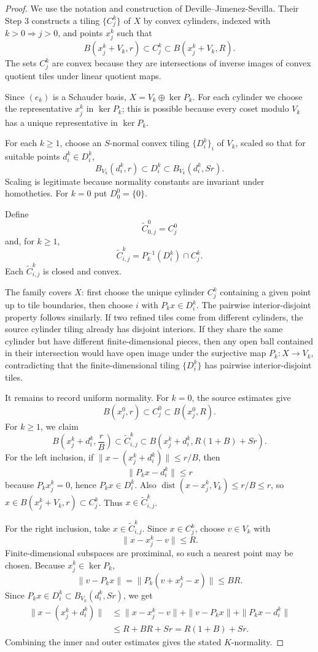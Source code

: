 \documentclass[11pt]{article}
\newcommand{\dist}{\operatorname{dist}}
\begin{document}
\begin{proof}
We use the notation and construction of Deville--Jimenez-Sevilla. Their Step
3 constructs a tiling $\{C^k_j\}$ of $X$ by convex cylinders, indexed with
$k>0\Rightarrow j>0$, and points $x^k_j$ such that
\[
   B(x^k_j+V_k,r)\subset C^k_j\subset B(x^k_j+V_k,R).
\]
The sets $C^k_j$ are convex because they are intersections of inverse images
of convex quotient tiles under linear quotient maps.

Since $(e_k)$ is a Schauder basis, $X=V_k\oplus \ker P_k$. For each cylinder
we choose the representative $x^k_j$ in $\ker P_k$; this is possible because
every coset modulo $V_k$ has a unique representative in $\ker P_k$.

For each $k\ge 1$, choose an $S$-normal convex tiling
$\{D_i^k\}_i$ of $V_k$, scaled so that for suitable points $d_i^k\in D_i^k$,
\[
   B_{V_k}(d_i^k,r)\subset D_i^k\subset B_{V_k}(d_i^k,Sr).
\]
Scaling is legitimate because normality constants are invariant under
homotheties. For $k=0$ put $D^0_0=\{0\}$.

Define
\[
   \widetilde C^0_{0,j}=C^0_j
\]
and, for $k\ge 1$,
\[
   \widetilde C^k_{i,j}=P_k^{-1}(D_i^k)\cap C^k_j.
\]
Each $\widetilde C^k_{i,j}$ is closed and convex.

The family covers $X$: first choose the unique cylinder $C^k_j$ containing a
given point up to tile boundaries, then choose $i$ with $P_kx\in D_i^k$. The
pairwise interior-disjoint property follows similarly. If two refined tiles
come from different cylinders, the source cylinder tiling already has
disjoint interiors. If they share the same cylinder but have different
finite-dimensional pieces, then any open ball contained in their intersection
would have open image under the surjective map $P_k:X\to V_k$, contradicting
that the finite-dimensional tiling $\{D_i^k\}$ has pairwise interior-disjoint
tiles.

It remains to record uniform normality. For $k=0$, the source estimates give
\[
   B(x^0_j,r)\subset C^0_j\subset B(x^0_j,R).
\]
For $k\ge 1$, we claim
\[
   B\left(x^k_j+d_i^k,\frac{r}{B}\right)
       \subset \widetilde C^k_{i,j}
       \subset B\left(x^k_j+d_i^k,R(1+B)+Sr\right).
\]
For the left inclusion, if
$\|x-(x^k_j+d_i^k)\|\le r/B$, then
\[
   \|P_kx-d_i^k\|\le r
\]
because $P_kx^k_j=0$, hence $P_kx\in D_i^k$. Also
$\dist(x-x^k_j,V_k)\le r/B\le r$, so $x\in B(x^k_j+V_k,r)\subset C^k_j$.
Thus $x\in \widetilde C^k_{i,j}$.

For the right inclusion, take $x\in\widetilde C^k_{i,j}$. Since
$x\in C^k_j$, choose $v\in V_k$ with
\[
   \|x-x^k_j-v\|\le R.
\]
Finite-dimensional subspaces are proximinal, so such a nearest point may be
chosen. Because $x^k_j\in\ker P_k$,
\[
   \|v-P_kx\|=\|P_k(v+x^k_j-x)\|\le B R.
\]
Since $P_kx\in D_i^k\subset B_{V_k}(d_i^k,Sr)$, we get
\[
\begin{aligned}
   \|x-(x^k_j+d_i^k)\|
      &\le \|x-x^k_j-v\|+\|v-P_kx\|+\|P_kx-d_i^k\| \\
      &\le R+BR+Sr=R(1+B)+Sr.
\end{aligned}
\]
Combining the inner and outer estimates gives the stated $K$-normality.
\end{proof}
\end{document}
